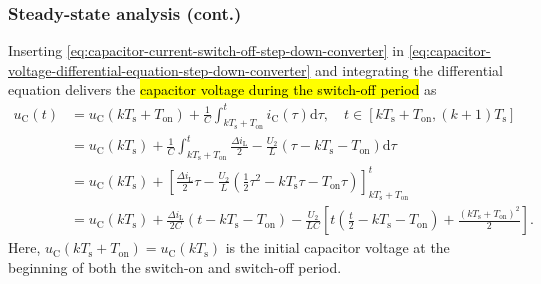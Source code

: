 \begin{frame}
    \frametitle{Steady-state analysis (cont.)}
    Inserting \eqref{eq:capacitor-current-switch-off-step-down-converter} in \eqref{eq:capacitor-voltage-differential-equation-step-down-converter} and integrating the differential equation delivers the \hl{capacitor voltage during the switch-off period} as
    \begin{equation}
        \begin{split}
            u_\mathrm{C}(t) &= u_\mathrm{C}(k T_\mathrm{s}+T_\mathrm{on}) + \frac{1}{C}\int_{k T_\mathrm{s}+T_\mathrm{on}}^t i_\mathrm{C}(\tau) \mathrm{d}\tau, \quad t\in [k T_\mathrm{s} + T_\mathrm{on}, (k+1) T_\mathrm{s}] \\
            &= u_\mathrm{C}(k T_\mathrm{s}) + \frac{1}{C}\int_{k T_\mathrm{s}+T_\mathrm{on}}^t \frac{\Delta i_\mathrm{L}}{2} - \frac{U_2}{L} (\tau - k T_\mathrm{s} - T_\mathrm{on}) \mathrm{d}\tau\\
            & = u_\mathrm{C}(k T_\mathrm{s}) + \left[\frac{\Delta i_\mathrm{L}}{2}\tau - \frac{U_2}{L} (\frac{1}{2}\tau^2 - k T_\mathrm{s}\tau - T_\mathrm{on}\tau) \right]_{k T_\mathrm{s}+T_\mathrm{on}}^t\\
            &= u_\mathrm{C}(k T_\mathrm{s}) + \frac{\Delta i_\mathrm{L}}{2 C}(t - k T_\mathrm{s} - T_\mathrm{on}) - \frac{U_2}{LC} \left[t(\frac{t}{2} - k T_\mathrm{s} - T_\mathrm{on}) + \frac{(k T_\mathrm{s} + T_\mathrm{on})^2}{2}\right].
        \end{split}
        \label{eq:capacitor-voltage-switch-off-step-down-converter}
    \end{equation}
    Here, $u_\mathrm{C}(k T_\mathrm{s}+T_\mathrm{on})=u_\mathrm{C}(k T_\mathrm{s})$ is the initial capacitor voltage at the beginning of both the switch-on and switch-off period.
\end{frame}

